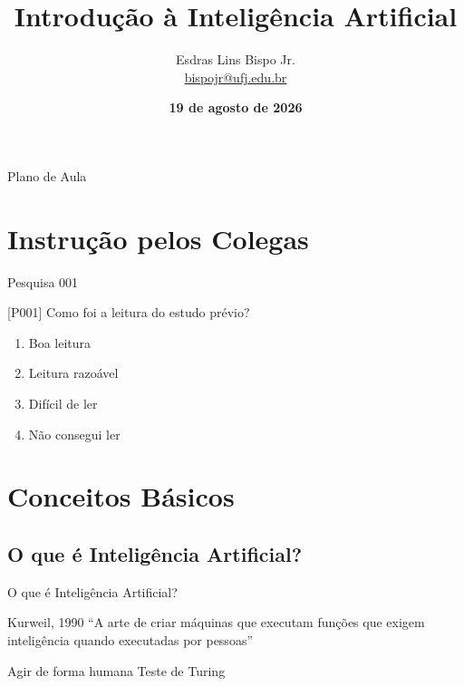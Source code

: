 \documentclass[xcolor=dvipsnames,table]{beamer}
\title{Introdução à Inteligência Artificial}
\author{
  Esdras Lins Bispo Jr. \\ \url{bispojr@ufj.edu.br}
  }
\institute{
  Inteligência Artificial \\Bacharelado em Ciência da Computação}
\date{\textbf{19 de agosto de 2026} }
\begin{document}
	\begin{frame}
		\titlepage
	\end{frame}

	\AtBeginSection{
		\begin{frame}{Sumário}%
    		\tableofcontents[currentsection]
		\end{frame}
	}

	\begin{frame}{Plano de Aula}
		\tableofcontents
	\end{frame}
	
	\section{Instrução pelos Colegas}
	

    \begin{frame}{Pesquisa 001}
		\begin{block}{[P001]}
			Como foi a leitura do estudo prévio?
		\end{block}
		\begin{enumerate}[label=(\Alph*)]
			\item Boa leitura
			\item Leitura razoável
			\item Difícil de ler
			\item Não consegui ler
		\end{enumerate}
	\end{frame}
    
\section{Conceitos Básicos}
\subsection{O que é Inteligência Artificial?}

        \begin{frame}{O que é Inteligência Artificial?}
		\begin{block}{Kurweil, 1990}
			``A arte de criar máquinas que executam funções que exigem inteligência quando executadas por pessoas''
		\end{block} \pause
		\begin{exampleblock}{Agir de forma humana}
			Teste de Turing
		\end{exampleblock}
	\end{frame}
        
\end{document}
